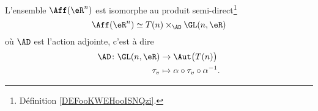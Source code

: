 \begin{proposition}  \label{PROPooTPFZooKtFxhg}
    L'ensemble \( \Aff(\eR^n)\) est isomorphe au produit semi-direct\footnote{Définition \ref{DEFooKWEHooISNQzi}.}
    \begin{equation}
        \Aff(\eR^n)\simeq  T(n)\times_{\AD}\GL(n,\eR)
    \end{equation}
    où \( \AD\) est l'action adjointe, c'est à dire
    \begin{equation}
        \begin{aligned}
            \AD\colon \GL(n,\eR)&\to \Aut\big( T(n) \big) \\
            \tau_v&\mapsto \alpha\circ\tau_v\circ\alpha^{-1}. 
        \end{aligned}
    \end{equation}
\end{proposition}

